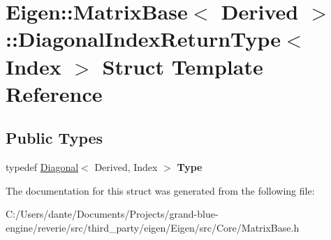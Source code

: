 \hypertarget{struct_eigen_1_1_matrix_base_1_1_diagonal_index_return_type}{}\section{Eigen\+::Matrix\+Base$<$ Derived $>$\+::Diagonal\+Index\+Return\+Type$<$ Index $>$ Struct Template Reference}
\label{struct_eigen_1_1_matrix_base_1_1_diagonal_index_return_type}
\subsection*{Public Types}
\begin{DoxyCompactItemize}
\item 
\mbox{\label{struct_eigen_1_1_matrix_base_1_1_diagonal_index_return_type_a4c66b5491a63942f06d1c0edebc8e390}} 
typedef \mbox{\hyperlink{class_eigen_1_1_diagonal}{Diagonal}}$<$ Derived, Index $>$ {\bfseries Type}
\end{DoxyCompactItemize}


The documentation for this struct was generated from the following file\+:\begin{DoxyCompactItemize}
\item 
C\+:/\+Users/dante/\+Documents/\+Projects/grand-\/blue-\/engine/reverie/src/third\+\_\+party/eigen/\+Eigen/src/\+Core/Matrix\+Base.\+h\end{DoxyCompactItemize}
